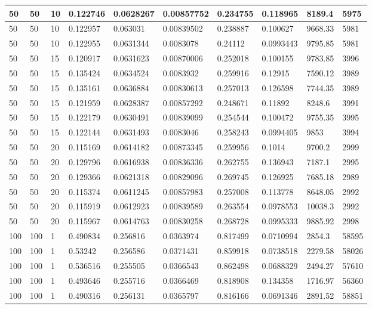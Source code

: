 \begin{landscape}
\begin{longtable}{ | l | l | l | l | l | l | l | l | l | l | }
50 & 50 & 10 & 0.122746 & 0.0628267 & 0.00857752 & 0.234755 & 0.118965 & 8189.4 & 5975\\ \hline
50 & 50 & 10 & 0.122957 & 0.063031 & 0.00839502 & 0.238887 & 0.100627 & 9668.33 & 5981\\ \hline
50 & 50 & 10 & 0.122955 & 0.0631344 & 0.0083078 & 0.24112 & 0.0993443 & 9795.85 & 5981\\ \hline
50 & 50 & 15 & 0.120917 & 0.0631623 & 0.00870006 & 0.252018 & 0.100155 & 9783.85 & 3996\\ \hline
50 & 50 & 15 & 0.135424 & 0.0634524 & 0.0083932 & 0.259916 & 0.12915 & 7590.12 & 3989\\ \hline
50 & 50 & 15 & 0.135161 & 0.0636884 & 0.00830613 & 0.257013 & 0.126598 & 7744.35 & 3989\\ \hline
50 & 50 & 15 & 0.121959 & 0.0628387 & 0.00857292 & 0.248671 & 0.11892 & 8248.6 & 3991\\ \hline
50 & 50 & 15 & 0.122179 & 0.0630491 & 0.00839099 & 0.254544 & 0.100472 & 9755.35 & 3995\\ \hline
50 & 50 & 15 & 0.122144 & 0.0631493 & 0.0083046 & 0.258243 & 0.0994405 & 9853 & 3994\\ \hline
50 & 50 & 20 & 0.115169 & 0.0614182 & 0.00873345 & 0.259956 & 0.1014 & 9700.2 & 2999\\ \hline
50 & 50 & 20 & 0.129796 & 0.0616938 & 0.00836336 & 0.262755 & 0.136943 & 7187.1 & 2995\\ \hline
50 & 50 & 20 & 0.129366 & 0.0621318 & 0.00829096 & 0.269745 & 0.126925 & 7685.18 & 2989\\ \hline
50 & 50 & 20 & 0.115374 & 0.0611245 & 0.00857983 & 0.257008 & 0.113778 & 8648.05 & 2992\\ \hline
50 & 50 & 20 & 0.115919 & 0.0612923 & 0.00839589 & 0.263554 & 0.0978553 & 10038.3 & 2992\\ \hline
50 & 50 & 20 & 0.115967 & 0.0614763 & 0.00830258 & 0.268728 & 0.0995333 & 9885.92 & 2998\\ \hline
100 & 100 & 1 & 0.490834 & 0.256816 & 0.0363974 & 0.817499 & 0.0710994 & 2854.3 & 58595\\ \hline
100 & 100 & 1 & 0.53242 & 0.256586 & 0.0371431 & 0.859918 & 0.0738518 & 2279.58 & 58026\\ \hline
100 & 100 & 1 & 0.536516 & 0.255505 & 0.0366543 & 0.862498 & 0.0688329 & 2494.27 & 57610\\ \hline
100 & 100 & 1 & 0.493646 & 0.255716 & 0.0366469 & 0.818908 & 0.134358 & 1716.97 & 56360\\ \hline
100 & 100 & 1 & 0.490316 & 0.256131 & 0.0365797 & 0.816166 & 0.0691346 & 2891.52 & 58851\\ \hline

\end{longtable}
\end{landscape}
